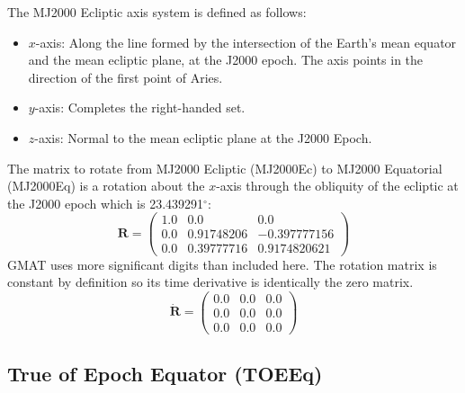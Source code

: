 {The MJ2000 Ecliptic axis system is defined as follows:
%
\begin{itemize}
\item $x$-axis:  Along the line formed by the intersection of the Earth's mean
                 equator and the mean ecliptic plane, at the J2000
                 epoch.  The axis points in the direction of the
                 first point of Aries.
%
\item $y$-axis:  Completes the right-handed set.
%
\item $z$-axis:  Normal to the mean ecliptic plane at the J2000 Epoch.
\end{itemize}
%
The matrix to rotate from MJ2000 Ecliptic (MJ2000Ec)  to MJ2000
Equatorial  (MJ2000Eq) is a rotation about the $x$-axis through the
obliquity of the ecliptic at the J2000 epoch which is
23.439291$^\circ$:
%
\begin{equation}
  \mathbf{R} =   \begin{pmatrix}
     1.0 & 0.0 & 0.0\\
     0.0 & 0.91748206 & -0.397777156\\
     0.0 & 0.39777716 & 0.9174820621
     \end{pmatrix} \label{Eq:Ec2Eq}
\end{equation}
%
GMAT uses more significant digits than included here.  The rotation
matrix is constant by definition so its time derivative is
identically the zero matrix.
%
\begin{equation}
  \dot{\mathbf{R}} =   \begin{pmatrix}
     0.0 & 0.0 & 0.0\\
     0.0 & 0.0 & 0.0\\
     0.0 & 0.0 & 0.0
     \end{pmatrix}
\end{equation}

\subsection{True of Epoch Equator (TOEEq) }
\label{Sec:TOEEq} 

}
